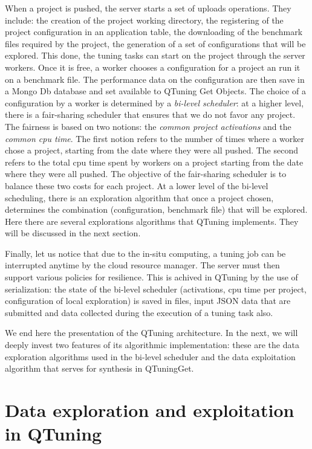 \documentclass[10pt, conference, compsocconf]{IEEEtran}
\begin{document}
When a project is pushed, the server starts a set of uploads operations. They include: the creation of the project working directory, 
the registering of the project configuration in an application table, the downloading of the benchmark files required by the project, 
the generation of a set of configurations that will be explored. This done, the tuning tasks can start on the project through the 
server workers. Once it is free, a worker chooses a configuration for a project an run it on a benchmark file. 
The performance data on the configuration are then save in a Mongo Db database and set available to QTuning Get Objects. 
The choice of a configuration by a worker is determined by a {\it bi-level scheduler}: at a higher level, there is a 
fair-sharing scheduler that ensures that we do not favor any project. The fairness is based on two notions: the {\it common 
project activations} and the {\it common cpu time}. The first notion refers to the number of times where a worker chose a project, starting 
from the date where they were all pushed. The second refers to the total cpu time spent by workers on a project starting from the 
date where they were all pushed. The objective of the fair-sharing scheduler is to balance these two costs for each project. 
At a lower level of the bi-level scheduling, there is an exploration algorithm that once a project chosen, determines the 
combination (configuration, benchmark file) that will be explored. Here there are several explorations algorithms that QTuning 
implements. They will be discussed in the next section. 

Finally, let us notice that due to the in-situ computing, a tuning job can be interrupted anytime by the cloud resource manager. 
The server must then support various policies for resilience. This is achived in 
QTuning by the use of serialization: the state of the bi-level scheduler (activations, cpu time per project, configuration of 
local exploration) is saved in files,  input JSON data that are submitted and data collected during the execution of a tuning task also.

We end here the presentation of the QTuning architecture. In the next, we will deeply invest two features of its 
algorithmic implementation: these are the data exploration algorithms used in the bi-level scheduler and the data 
exploitation algorithm that serves for synthesis in QTuningGet. 

\section{Data exploration and exploitation in QTuning} \label{Exploration}
\end{document}
